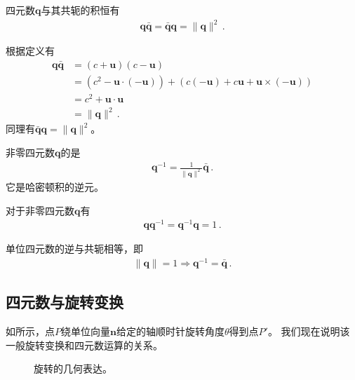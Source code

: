 \begin{proposition}
    四元数${\bm q}$与其共轭的积恒有
    \begin{align}
        {\bm q}\bar{\bm q}=\bar{\bm q}{\bm q}=\|{\bm q}\|^2\, .
    \end{align}
\end{proposition}
\begin{prove}
    根据定义有
    \begin{align}
        {\bm q}\bar{\bm q} & =(c+{\bm u})(c-{\bm u})\nonumber                                                      \\
                           & =(c^2-{\bm u}\cdot(-{\bm u}))+(c(-{\bm u})+c{\bm u}+{\bm u}\times(-{\bm u}))\nonumber \\
                           & =c^2+{\bm u}\cdot{\bm u}\nonumber                                                     \\
                           & =\|{\bm q}\|^2\, .
    \end{align}
    同理有$\bar{\bm q}{\bm q}=\|{\bm q}\|^2$。
\end{prove}
\begin{definition}
    非零四元数${\bm q}$的是
    \begin{align}
        {\bm q}^{-1}=\frac{1}{\|{\bm q}\|^2}\bar{\bm q}\, .
    \end{align}
    它是哈密顿积的逆元。
\end{definition}
\begin{corollary}
    对于非零四元数${\bm q}$有
    \begin{align}
        {\bm q}{\bm q}^{-1}={\bm q}^{-1}{\bm q}=1\, .
    \end{align}
\end{corollary}
\begin{corollary}
    单位四元数的逆与共轭相等，即
    \begin{align}
        \|{\bm q}\|=1 \Rightarrow {\bm q}^{-1}=\bar{\bm q}\, .
    \end{align}
\end{corollary}

\subsection{四元数与旋转变换}\label{sub:四元数与旋转变换}
如所示，点$P$绕单位向量$\bm n$给定的轴顺时针旋转角度$\theta$得到点$P'$。
我们现在说明该一般旋转变换和四元数运算的关系。
\begin{figure}[htbp]
    \centering
    \caption{旋转的几何表达。}
    \label{fig:2.ex1}
\end{figure}

